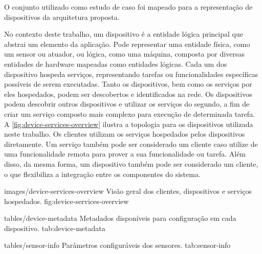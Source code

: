 O conjunto utilizado como estudo de caso foi mapeado para a representação de dispositivos da
arquitetura proposta.

No contexto deste trabalho, um dispositivo é a entidade lógica principal que abstrai um elemento da
aplicação. Pode representar uma entidade física, como um sensor ou atuador, ou lógica, como uma
máquina, composta por diversas entidades de hardware mapeadas como entidades lógicas. Cada um dos
dispositivo hospeda serviços, representando tarefas ou funcionalidades específicas possíveis de
serem executadas. Tanto os dispositivos, bem como os serviços por eles hospedados, podem ser
descobertos e identificados na rede. Os dispositivos podem descobrir outros dispositivos e utilizar
os serviços do segundo, a fim de criar um serviço composto mais complexo para execução de
determinada tarefa. A \cref{fig:device-services-overview} ilustra a topologia para os dispositivos
utilizada neste trabalho. Os clientes utilizam os serviços hospedados pelos dispositivos
diretamente. Um serviço também pode ser considerado um cliente caso utilize de uma funcionalidade
remota para prover a sua funcionalidade ou tarefa. Além disso, da mesma forma, um dispositivo também
pode ser considerado um cliente, o que flexibiliza a integração entre os componentes do sistema.

    {images/device-services-overview}
    {Visão geral dos clientes, dispositivos e serviços hospedados.}
    {fig:device-services-overview}

\iffalse
O modelo de dispositivos empregados neste estudo é apresentado na figura\todo{Incluir figura}. Nela,
o dispositivo físico é abstraído por um dispositivo lógico, identificado por\textit{XX*}. O
dispositivo lógico inclui alguns serviços padrão, referenciando funcionalidades que podem ser
encontradas em todos os dispositivos presentes na arquitetura proposta. Dentre os serviços padrão,
tem-se o serviço de implantação de novos serviços. Este serviço permite que outros serviços sejam
adicionados ao dispositivo físico. Além disso, é possível a implantação de novos dispositivos
lógicos, a fim de abstrair componentes da aplicação, juntamente com serviços do
usuário\todo{Melhorar o texto com base na imagem que será incluída.}.
\fi

  {tables/device-metadata}
  {Metadados disponíveis para configuração em cada dispositivo.}
  {tab:device-metadata}


  {tables/sensor-info}
  {Parâmetros configuráveis dos sensores.}
  {tab:sensor-info}



